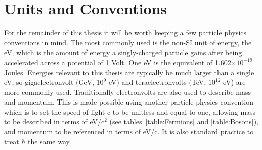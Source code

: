 \section{Units and Conventions}
 
For the remainder of this thesis it will be worth keeping a few particle physics conventions in mind.  
The most commonly used is the non-SI unit of energy, the \gls{eV}, which is the amount of energy a singly-charged particle gains after being accelerated across a potential of 1 Volt.  
One eV is the equivalent of 1.602$\times 10^{-19}$ Joules.  
Energies relevant to this thesis are typically be much larger than a single eV, so gigaelectronvolt (GeV, $10^9$ eV) and teraelectronvolts  (TeV, $10^{12}$ eV) are more commonly used.  
Traditionally electronvolts are also used to describe mass and momentum.  
This is made possible using another particle physics convention which is to set the speed of light c to be unitless and equal to one, allowing mass to be described in terms of eV/c$^2$ (see tables~\ref{table:Fermions} and \ref{table:Bosons}), and momentum to be referenced in terms of eV/c.  
It is also standard practice to treat $\hbar$ the same way.

